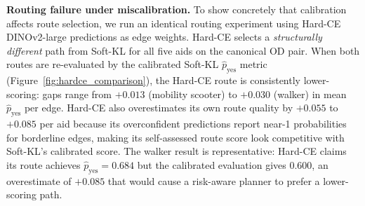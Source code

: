 \documentclass[conference]{IEEEtran}
\begin{document}
\begin{table}[!t]
\caption{\textbf{ORS wheelchair profile vs.\ our method on 50 Pittsburgh OD pairs.} ORS fails on 20\% of pairs (sparse OSM kerb tags). Mean $\hat{p}_\mathrm{yes}$ on the 40 routable pairs; \textbf{$\Delta$ (Ours--ORS)} is the paired difference with its 95\% CI. The signed difference is positive for every aid in this Pittsburgh snapshot, although the CIs are wide given $n=40$.}
\label{tab:ors}
\centering\small
\setlength{\tabcolsep}{3.5pt}
\end{table}

\textbf{Routing failure under miscalibration.} To show concretely that calibration affects route selection, we run an identical routing experiment using Hard-CE DINOv2-large predictions as edge weights. Hard-CE selects a \emph{structurally different} path from Soft-KL for all five aids on the canonical OD pair. When both routes are re-evaluated by the calibrated Soft-KL $\hat{p}_\mathrm{yes}$ metric (Figure~\ref{fig:hardce_comparison}), the Hard-CE route is consistently lower-scoring: gaps range from $+0.013$ (mobility scooter) to $+0.030$ (walker) in mean $\hat{p}_\mathrm{yes}$ per edge. Hard-CE also overestimates its own route quality by $+0.055$ to $+0.085$ per aid because its overconfident predictions report near-1 probabilities for borderline edges, making its self-assessed route score look competitive with Soft-KL's calibrated score. The walker result is representative: Hard-CE claims its route achieves $\hat{p}_\mathrm{yes}=0.684$ but the calibrated evaluation gives $0.600$, an overestimate of $+0.085$ that would cause a risk-aware planner to prefer a lower-scoring path.
\end{document}
